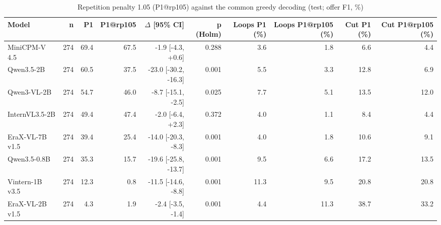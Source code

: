 \begin{table}[t]
\centering
\caption{Repetition penalty 1.05 (P1@rp105) against the common greedy decoding (test; offer F1, \%)}
\label{tab:decoding}
\small
\begin{tabular}{lrrrrrrrrr}
\toprule
Model & n & P1 & P1@rp105 & $\Delta$ [95\% CI] & p (Holm) & Loops P1 (\%) & Loops P1@rp105 (\%) & Cut P1 (\%) & Cut P1@rp105 (\%) \\
\midrule
MiniCPM-V 4.5 & 274 & 69.4 & 67.5 & -1.9 [-4.3, +0.6] & 0.288 & 3.6 & 1.8 & 6.6 & 4.4 \\
Qwen3.5-2B & 274 & 60.5 & 37.5 & -23.0 [-30.2, -16.3] & 0.001 & 5.5 & 3.3 & 12.8 & 6.9 \\
Qwen3-VL-2B & 274 & 54.7 & 46.0 & -8.7 [-15.1, -2.5] & 0.025 & 7.7 & 5.1 & 13.5 & 12.0 \\
InternVL3.5-2B & 274 & 49.4 & 47.4 & -2.0 [-6.4, +2.3] & 0.372 & 4.0 & 1.1 & 8.4 & 4.4 \\
EraX-VL-7B v1.5 & 274 & 39.4 & 25.4 & -14.0 [-20.3, -8.3] & 0.001 & 4.0 & 1.8 & 10.6 & 9.1 \\
Qwen3.5-0.8B & 274 & 35.3 & 15.7 & -19.6 [-25.8, -13.7] & 0.001 & 9.5 & 6.6 & 17.2 & 13.5 \\
Vintern-1B v3.5 & 274 & 12.3 & 0.8 & -11.5 [-14.6, -8.8] & 0.001 & 11.3 & 9.5 & 20.8 & 20.8 \\
EraX-VL-2B v1.5 & 274 & 4.3 & 1.9 & -2.4 [-3.5, -1.4] & 0.001 & 4.4 & 11.3 & 38.7 & 33.2 \\
\bottomrule
\end{tabular}
\par{}
\end{table}
